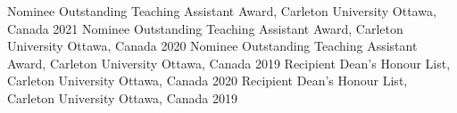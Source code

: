 



\begin{cvhonors}

  \cvhonor
    {Nominee} %
    {Outstanding Teaching Assistant Award, Carleton University} %
    {Ottawa, Canada} %
    {2021} %
  \cvhonor
    {Nominee} %
    {Outstanding Teaching Assistant Award, Carleton University} %
    {Ottawa, Canada} %
    {2020} %
  \cvhonor
    {Nominee} %
    {Outstanding Teaching Assistant Award, Carleton University} %
    {Ottawa, Canada} %
    {2019} %
  \cvhonor
    {Recipient} %
    {Dean's Honour List, Carleton University} %
    {Ottawa, Canada} %
    {2020} %
  \cvhonor
    {Recipient} %
    {Dean's Honour List, Carleton University} %
    {Ottawa, Canada} %
    {2019} %

\end{cvhonors}



